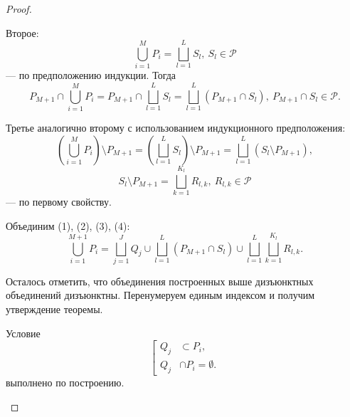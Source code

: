 \begin{proof}
\begin{enumerate}
    Второе:
    \[\bigcup_{i=1}^M P_i = \bigsqcup_{l = 1}^L S_l, \ S_l \in \mathcal{P}\]
    — по предположению индукции.
    Тогда
    \begin{equation}
        P_{M+1} \cap \bigcup_{i=1}^M P_i = P_{M+1} \cap \bigsqcup_{l = 1}^L S_l = \bigsqcup_{l = 1}^L (P_{M+1} \cap S_l), \ P_{M+1} \cap S_l \in \mathcal{P}.
    \end{equation}

    Третье аналогично второму с использованием индукционного предположения:
    \begin{equation}
        \left(\bigcup_{i=1}^M P_i \right) \setminus P_{M+1} = \left( \bigsqcup_{l = 1}^L S_l \right) \setminus P_{M+1} = \bigsqcup_{l = 1}^L (S_l \setminus P_{M+1}),
    \end{equation}
    \begin{equation}
        S_l \setminus P_{M+1} = \bigsqcup_{k = 1}^{K_l} R_{l,k}, \ R_{l,k} \in \mathcal{P}
    \end{equation}
    — по первому свойству.

    Объединим (1), (2), (3), (4):
    \[\bigcup_{i=1}^{M+1} P_i = \bigsqcup_{j=1}^{J} Q_j \cup \bigsqcup_{l = 1}^L (P_{M+1} \cap S_l) \cup \bigsqcup_{l = 1}^L \bigsqcup_{k = 1}^{K_l} R_{l,k}.\]

    Осталось отметить, что объединения построенных выше дизъюнктных объединений дизъюнктны. Перенумеруем единым индексом и получим утверждение теоремы.

    Условие
    \[
        \left[
        \begin{aligned}
        Q_j &\subset P_i, \\
        Q_j &\cap P_i = \emptyset.
        \end{aligned}
        \right.
    \]
    выполнено по построению.


\end{enumerate}
\end{proof} 

